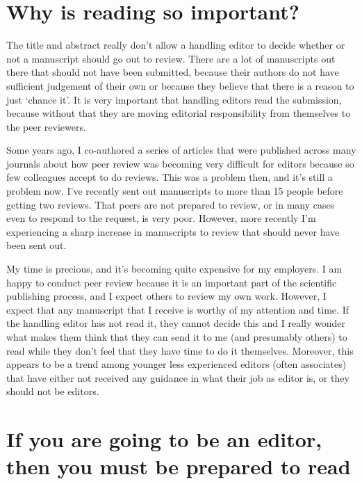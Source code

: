 \documentclass[
]{krantz}
\begin{document}
\hypertarget{why-is-reading-so-important}{%
\section{Why is reading so important?}\label{why-is-reading-so-important}}

The title and abstract really don't allow a handling editor to decide whether or not a manuscript should go out to review. There are a lot of manuscripts out there that should not have been submitted, because their authors do not have sufficient judgement of their own or because they believe that there is a reason to just `chance it'. It is very important that handling editors read the submission, because without that they are moving editorial responsibility from themselves to the peer reviewers.

Some years ago, I co-authored a series of articles \citep{perry2012peer} that were published across many journals about how peer review was becoming very difficult for editors because so few colleagues accept to do reviews. This was a problem then, and it's still a problem now. I've recently sent out manuscripts to more than 15 people before getting two reviews. That peers are not prepared to review, or in many cases even to respond to the request, is very poor. However, more recently I'm experiencing a sharp increase in manuscripts to review that should never have been sent out.

My time is precious, and it's becoming quite expensive for my employers. I am happy to conduct peer review because it is an important part of the scientific publishing process, and I expect others to review my own work. However, I expect that any manuscript that I receive is worthy of my attention and time. If the handling editor has not read it, they cannot decide this and I really wonder what makes them think that they can send it to me (and presumably others) to read while they don't feel that they have time to do it themselves. Moreover, this appears to be a trend among younger less experienced editors (often associates) that have either not received any guidance in what their job as editor is, or they should not be editors.

\hypertarget{if-you-are-going-to-be-an-editor-then-you-must-be-prepared-to-read}{%
\section{If you are going to be an editor, then you must be prepared to read}\label{if-you-are-going-to-be-an-editor-then-you-must-be-prepared-to-read}}
\end{document}
